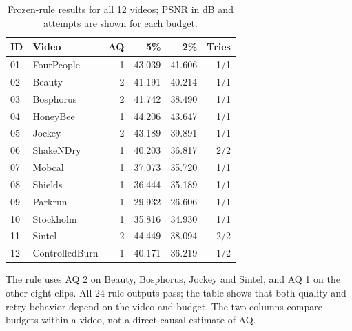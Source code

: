 \documentclass[conference]{IEEEtran}
\begin{document}
\begin{table}[H]\centering\caption{Frozen-rule results for all 12 videos; PSNR in dB and attempts are shown for each budget.}
\begin{tabular}{llrrrr}\toprule
ID & Video & AQ & 5\% & 2\% & Tries\\\midrule
01 & FourPeople & 1 & 43.039 & 41.606 & 1/1 \\
02 & Beauty & 2 & 41.191 & 40.214 & 1/1 \\
03 & Bosphorus & 2 & 41.742 & 38.490 & 1/1 \\
04 & HoneyBee & 1 & 44.206 & 43.647 & 1/1 \\
05 & Jockey & 2 & 43.189 & 39.891 & 1/1 \\
06 & ShakeNDry & 1 & 40.203 & 36.817 & 2/2 \\
07 & Mobcal & 1 & 37.073 & 35.720 & 1/1 \\
08 & Shields & 1 & 36.444 & 35.189 & 1/1 \\
09 & Parkrun & 1 & 29.932 & 26.606 & 1/1 \\
10 & Stockholm & 1 & 35.816 & 34.930 & 1/1 \\
11 & Sintel & 2 & 44.449 & 38.094 & 2/2 \\
12 & ControlledBurn & 1 & 40.171 & 36.219 & 1/2 \\
\bottomrule\end{tabular}\end{table}
The rule uses AQ 2 on Beauty, Bosphorus, Jockey and Sintel, and AQ 1 on the other eight clips. All 24 rule outputs pass; the table shows that both quality and retry behavior depend on the video and budget. The two columns compare budgets within a video, not a direct causal estimate of AQ.
\end{document}
